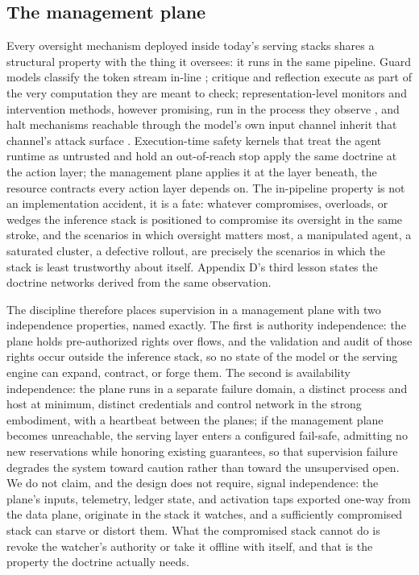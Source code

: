 \subsection{The management plane}

Every oversight mechanism deployed inside today's serving stacks shares a
structural property with the thing it oversees: it runs in the same
pipeline. Guard models classify the token stream in-line
\citep{llamaguard2023}; critique and reflection execute as part of the very
computation they are meant to check; representation-level monitors and
intervention methods, however promising, run in the process they observe
\citep{zou2024circuitbreakers}, and halt mechanisms reachable through the
model's own input channel inherit that channel's attack surface
\citep{killbench2025}. Execution-time safety kernels that treat the agent
runtime as untrusted and hold an out-of-reach stop \citep{safetykernel2026}
apply the same doctrine at the action layer; the management plane applies
it at the layer beneath, the resource contracts every action layer
depends on. The in-pipeline property is not an implementation accident,
it is a fate: whatever compromises, overloads, or wedges the inference
stack is positioned to compromise its oversight in the same stroke, and
the scenarios in which oversight matters most, a manipulated agent, a
saturated cluster, a defective rollout, are precisely the scenarios in
which the stack is least trustworthy about itself. Appendix D's third lesson states the doctrine networks derived from the same observation.

The discipline therefore places supervision in a management plane with
two independence properties, named exactly. The first is authority
independence: the plane holds pre-authorized rights over flows, and the
validation and audit of those rights occur outside the inference stack,
so no state of the model or the serving engine can expand, contract, or
forge them. The second is availability independence: the plane runs in a
separate failure domain, a distinct process and host at minimum, distinct
credentials and control network in the strong embodiment, with a
heartbeat between the planes; if the management plane becomes
unreachable, the serving layer enters a configured fail-safe, admitting
no new reservations while honoring existing guarantees, so that
supervision failure degrades the system toward caution rather than toward
the unsupervised open. We do not claim, and the design does not require,
signal independence: the plane's inputs, telemetry, ledger state, and
activation taps exported one-way from the data plane, originate in the
stack it watches, and a sufficiently compromised stack can starve or
distort them. What the compromised stack cannot do is revoke the
watcher's authority or take it offline with itself, and that is the
property the doctrine actually needs.

